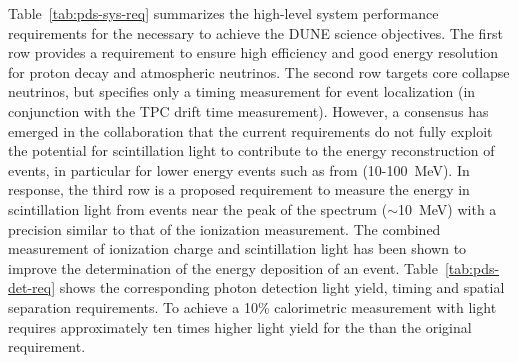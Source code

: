 Table~\ref{tab:pds-sys-req} summarizes the high-level system performance requirements for the  necessary to achieve the DUNE science objectives. The first row provides a requirement to ensure high efficiency and good energy resolution for proton decay and atmospheric neutrinos.  The second row targets core collapse  neutrinos, but specifies only a timing measurement for event localization (in conjunction with the TPC drift time measurement). 
However, a consensus has emerged in the collaboration that the current requirements do not fully exploit the potential  for \lar scintillation light to contribute to the energy reconstruction of events, in particular for lower energy events such as from  %
(\num{10}-\SI{100}{MeV}). In response, the third row is a proposed requirement to measure the energy in scintillation light from  events near the peak of the spectrum ($\sim$\SI{10}{MeV}) with a precision similar to that of the ionization measurement. The combined measurement of ionization charge and scintillation light has been shown to improve the determination of the energy deposition of an event. 
Table~\ref{tab:pds-det-req} shows the corresponding photon detection light yield, timing and spatial separation requirements. To achieve a \num{10}\%  calorimetric measurement with light requires approximately ten times higher light yield for the  than the original requirement. 




